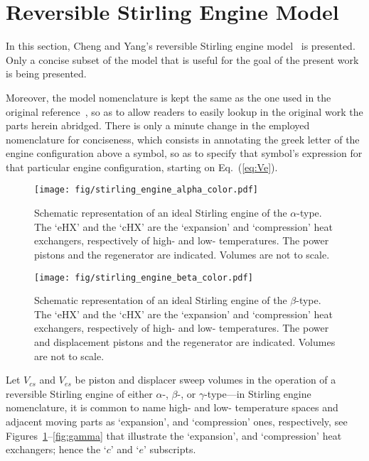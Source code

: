 \section{Reversible Stirling Engine Model}

    In     this     section,     Cheng     and     Yang's     reversible     Stirling     engine
    model~\cite{2012-ChengCH+YangHS-ApEnergy} is presented. Only a concise subset of  the  model
    that is useful for the goal of the present work is being presented.

    Moreover, the model nomenclature  is  kept  the  same  as  the  one  used  in  the  original
    reference~\cite{2012-ChengCH+YangHS-ApEnergy}, so as to allow readers to  easily  lookup  in
    the original work the parts herein abridged. There is only a minute change in  the  employed
    nomenclature for conciseness, which consists in annotating the greek letter  of  the  engine
    configuration above a symbol, so as to specify that symbol's expression for that  particular
    engine configuration, starting on Eq.~(\ref{eq:Ve}).

    \begin{figure}[ht]
        \centering
        \texttt{[image: fig/stirling\_engine\_alpha\_color.pdf]}
        \caption{Schematic representation of an ideal Stirling engine of the $\alpha$-type.  The
            `eHX'  and  the  `cHX'  are  the  `expansion'  and  `compression'  heat  exchangers,
            respectively of high- and low- temperatures. The power pistons and  the  regenerator
            are indicated. Volumes are not to scale.}
        \label{fig:alpha}
    \end{figure}

    \begin{figure}[ht]
        \centering
        \texttt{[image: fig/stirling\_engine\_beta\_color.pdf]}
        \caption{Schematic representation of an ideal Stirling engine of the  $\beta$-type.  The
            `eHX'  and  the  `cHX'  are  the  `expansion'  and  `compression'  heat  exchangers,
            respectively of high- and low- temperatures. The power and displacement pistons  and
            the regenerator are indicated. Volumes are not to scale.}
        \label{fig:beta}
    \end{figure}

    Let $V_{cs}$ and $V_{es}$ be piston and displacer  sweep  volumes  in  the  operation  of  a
    reversible Stirling engine of either $\alpha$-,  $\beta$-,  or  $\gamma$-type---in  Stirling
    engine nomenclature, it is common to name high- and low-  temperature  spaces  and  adjacent
    moving   parts   as    `expansion',    and    `compression'    ones,    respectively,    see
    Figures~\ref{fig:alpha}--\ref{fig:gamma} that illustrate the `expansion', and  `compression'
    heat exchangers; hence the `$c$' and `$e$' subscripts.


